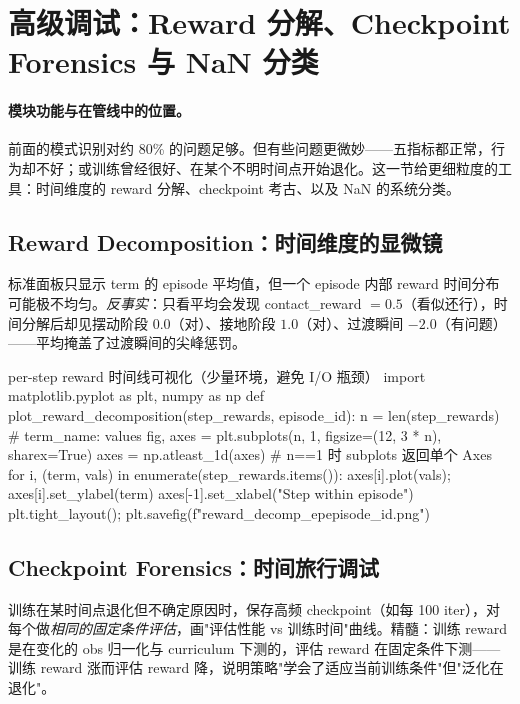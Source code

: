 \section{高级调试：Reward 分解、Checkpoint Forensics 与 NaN 分类}
\label{sec:rlmc-diag-advanced}

\paragraph{模块功能与在管线中的位置。}前面的模式识别对约 80\% 的问题足够。但有些问题更微妙——五指标都正常，行为却不好；或训练曾经很好、在某个不明时间点开始退化。这一节给更细粒度的工具：时间维度的 reward 分解、checkpoint 考古、以及 NaN 的系统分类。

\subsection{Reward Decomposition：时间维度的显微镜}

标准面板只显示 term 的 episode 平均值，但一个 episode 内部 reward 时间分布可能极不均匀。\emph{反事实}：只看平均会发现 contact\_reward $=0.5$（看似还行），时间分解后却见摆动阶段 $0.0$（对）、接地阶段 $1.0$（对）、过渡瞬间 $-2.0$（有问题）——平均掩盖了过渡瞬间的尖峰惩罚。

\begin{codebox}[Python]{per-step reward 时间线可视化（少量环境，避免 I/O 瓶颈）}
import matplotlib.pyplot as plt, numpy as np
def plot_reward_decomposition(step_rewards, episode_id):
    n = len(step_rewards)  # {term_name: values}
    fig, axes = plt.subplots(n, 1, figsize=(12, 3 * n), sharex=True)
    axes = np.atleast_1d(axes)  # n==1 时 subplots 返回单个 Axes
    for i, (term, vals) in enumerate(step_rewards.items()):
        axes[i].plot(vals); axes[i].set_ylabel(term)
    axes[-1].set_xlabel("Step within episode")
    plt.tight_layout(); plt.savefig(f"reward_decomp_ep{episode_id}.png")
\end{codebox}

\subsection{Checkpoint Forensics：时间旅行调试}

训练在某时间点退化但不确定原因时，保存高频 checkpoint（如每 100 iter），对每个做\emph{相同的固定条件评估}，画"评估性能 vs 训练时间"曲线。精髓：训练 reward 是在变化的 obs 归一化与 curriculum 下测的，评估 reward 在固定条件下测——训练 reward 涨而评估 reward 降，说明策略"学会了适应当前训练条件"但"泛化在退化"。

